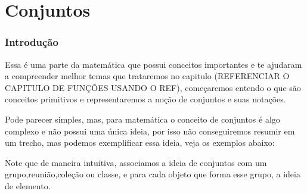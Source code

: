 \part{Conjuntos}
\section{Introdução}
Essa é uma parte da matemática que possui conceitos importantes e te ajudaram a compreender melhor temas que trataremos no capitulo (REFERENCIAR O CAPITULO DE FUNÇÕES USANDO O REF), começaremos entendo o que são conceitos primitivos e representaremos a noção de conjuntos e suas notações.

Pode parecer simples, mas, para matemática o conceito de conjuntos é algo complexo e não possui uma única ideia, por isso não conseguiremos resumir em um trecho, mas podemos exemplificar essa ideia, veja os exemplos abaixo:

\begin{example}
	
\end{example}


Note que de maneira intuitiva, associamos a ideia de conjuntos com um grupo,reunião,coleção ou classe, e para cada objeto que forma esse grupo, a ideia de elemento.